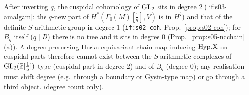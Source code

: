 \begin{remark}\label{rem:s05-degree}
After inverting $q$, the cuspidal cohomology of $\mathrm{GL}_2$ sits in degree $2$ (\ref{if:s03-amalgam}: the $q$-new part of
$H^*(\Gamma_0(M)[\frac1q],V)$ is in $H^2$) and that of the definite $S$-arithmetic group in degree $1$ (\texttt{if:s02-coh},
Prop.~\ref{prop:s02-coh}); for $B_q$ itself ($q\mid D$) there is no tree and it sits in degree $0$ (Prop.~\ref{prop:s05-nochain}(a)). A
degree-preserving Hecke-equivariant chain map inducing $\mathrm{Hyp.X}$ on cuspidal parts therefore cannot exist between the $S$-arithmetic
complexes of $\mathrm{GL}_2(\mathbb{Z}[\frac1q])$-type (cuspidal part in degree $2$) and of $B_q$ (degree $0$); any realisation must shift degree (e.g.\ through a boundary or Gysin-type map) or go through a third object. \stsketch{}
(degree count only).
\end{remark}

